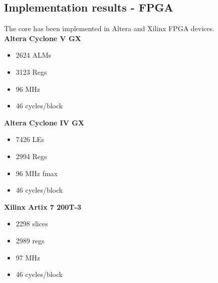 \documentclass[../main.tex]{subfiles}
\begin{document}
\subsection*{Implementation results - FPGA}
The core has been implemented in Altera and Xilinx FPGA devices.\\
\textbf{Altera Cyclone V GX}
\begin{itemize}
    \item 2624 ALMs
    \item 3123 Regs
    \item 96 MHz
    \item 46 cycles/block
\end{itemize}

\textbf{Altera Cyclone IV GX}
\begin{itemize}
    \item 7426 LEs
    \item 2994 Regs
    \item 96 MHz fmax
    \item 46 cycles/block
\end{itemize}

\textbf{Xilinx Artix 7 200T-3}
\begin{itemize}
    \item 2298 slices
    \item 2989 regs
    \item 97 MHz
    \item 46 cycles/block
\end{itemize}
\end{document}
